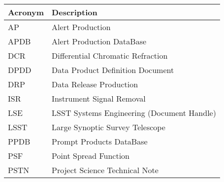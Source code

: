 \addtocounter{table}{-1}
\begin{longtable}{p{}p{}}\hline
\textbf{Acronym} & \textbf{Description}  \\\hline

AP & Alert Production \\\hline
APDB & Alert Production DataBase \\\hline
DCR & Differential Chromatic Refraction \\\hline
DPDD & Data Product Definition Document \\\hline
DRP & Data Release Production \\\hline
ISR & Instrument Signal Removal \\\hline
LSE & LSST Systems Engineering (Document Handle) \\\hline
LSST & Large Synoptic Survey Telescope \\\hline
PPDB & Prompt Products DataBase \\\hline
PSF & Point Spread Function \\\hline
PSTN & Project Science Technical Note \\\hline
\end{longtable}
